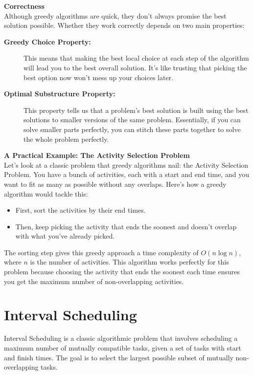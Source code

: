 \documentclass[12pt]{book} %
\begin{document}
\textbf{Correctness}\\
Although greedy algorithms are quick, they don't always promise the best solution possible. Whether they work correctly depends on two main properties:

\begin{description}
    \item[\textbf{Greedy Choice Property:}] This means that making the best local choice at each step of the algorithm will lead you to the best overall solution. It's like trusting that picking the best option now won’t mess up your choices later.
    
    \item[\textbf{Optimal Substructure Property:}] This property tells us that a problem’s best solution is built using the best solutions to smaller versions of the same problem. Essentially, if you can solve smaller parts perfectly, you can stitch these parts together to solve the whole problem perfectly.
\end{description}

\textbf{A Practical Example: The Activity Selection Problem}\\
Let's look at a classic problem that greedy algorithms nail: the Activity Selection Problem. You have a bunch of activities, each with a start and end time, and you want to fit as many as possible without any overlaps. Here's how a greedy algorithm would tackle this:

\begin{itemize}
    \item First, sort the activities by their end times.
    \item Then, keep picking the activity that ends the soonest and doesn't overlap with what you've already picked.
\end{itemize}

The sorting step gives this greedy approach a time complexity of \(O(n \log n)\), where \(n\) is the number of activities. This algorithm works perfectly for this problem because choosing the activity that ends the soonest each time ensures you get the maximum number of non-overlapping activities.

\section{Interval Scheduling}
Interval Scheduling is a classic algorithmic problem that involves scheduling a maximum number of mutually compatible tasks, given a set of tasks with start and finish times. The goal is to select the largest possible subset of mutually non-overlapping tasks.
\end{document}
